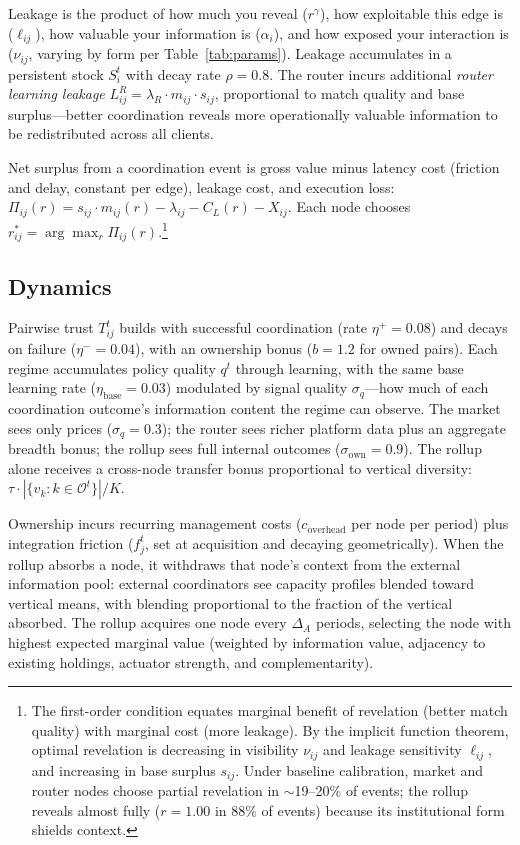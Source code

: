 \documentclass[12pt]{article}
\theoremstyle{definition}
\begin{document}
\noindent Leakage is the product of how much you reveal ($r^\gamma$), how exploitable this edge is ($\ell_{ij}$), how valuable your information is ($\alpha_i$), and how exposed your interaction is ($\nu_{ij}$, varying by form per Table~\ref{tab:params}). Leakage accumulates in a persistent stock $S_i^t$ with decay rate $\rho = 0.8$. The router incurs additional \textit{router learning leakage} $L^R_{ij} = \lambda_R \cdot m_{ij} \cdot s_{ij}$, proportional to match quality and base surplus---better coordination reveals more operationally valuable information to be redistributed across all clients.

Net surplus from a coordination event is gross value minus latency cost (friction and delay, constant per edge), leakage cost, and execution loss: $\Pi_{ij}(r) = s_{ij} \cdot m_{ij}(r) - \lambda_{ij} - C_L(r) - X_{ij}$. Each node chooses $r^*_{ij} = \arg\max_r \Pi_{ij}(r)$.\footnote{The first-order condition equates marginal benefit of revelation (better match quality) with marginal cost (more leakage). By the implicit function theorem, optimal revelation is decreasing in visibility $\nu_{ij}$ and leakage sensitivity $\ell_{ij}$, and increasing in base surplus $s_{ij}$. Under baseline calibration, market and router nodes choose partial revelation in $\sim$19--20\% of events; the rollup reveals almost fully ($r = 1.00$ in 88\% of events) because its institutional form shields context.}

\subsection{Dynamics}

Pairwise trust $T_{ij}^t$ builds with successful coordination (rate $\eta^+ = 0.08$) and decays on failure ($\eta^- = 0.04$), with an ownership bonus ($b = 1.2$ for owned pairs). Each regime accumulates policy quality $q^t$ through learning, with the same base learning rate ($\eta_{\text{base}} = 0.03$) modulated by signal quality $\sigma_q$---how much of each coordination outcome's information content the regime can observe. The market sees only prices ($\sigma_q = 0.3$); the router sees richer platform data plus an aggregate breadth bonus; the rollup sees full internal outcomes ($\sigma_{\text{own}} = 0.9$). The rollup alone receives a cross-node transfer bonus proportional to vertical diversity: $\tau \cdot |\{v_k : k \in \mathcal{O}^t\}| / K$.

Ownership incurs recurring management costs ($c_{\text{overhead}}$ per node per period) plus integration friction ($f_j^t$, set at acquisition and decaying geometrically). When the rollup absorbs a node, it withdraws that node's context from the external information pool: external coordinators see capacity profiles blended toward vertical means, with blending proportional to the fraction of the vertical absorbed. The rollup acquires one node every $\Delta_A$ periods, selecting the node with highest expected marginal value (weighted by information value, adjacency to existing holdings, actuator strength, and complementarity).
\end{document}
